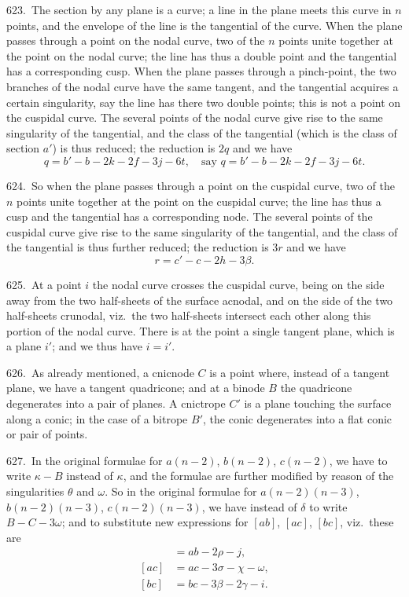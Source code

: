 \documentclass[11pt,a4paper]{article}
\theoremstyle{plain}
\theoremstyle{definition}
\theoremstyle{remark}
\begin{document}
623.\ The section by any plane is a curve; a line in the plane meets this curve in $n$ points, and the envelope of the line is the tangential of the curve. When the plane passes through a point on the nodal curve, two of the $n$ points unite together at the point on the nodal curve; the line has thus a double point and the tangential has a corresponding cusp. When the plane passes through a pinch-point, the two branches of the nodal curve have the same tangent, and the tangential acquires a certain singularity, say the line has there two double points; this is not a point on the cuspidal curve. The several points of the nodal curve give rise to the same singularity of the tangential, and the class of the tangential (which is the class of section $a'$) is thus reduced; the reduction is $2q$ and we have
\[
q = b'-b-2k-2f-3j-6t,\quad\text{say }q=b'-b-2k-2f-3j-6t.
\]

624.\ So when the plane passes through a point on the cuspidal curve, two of the $n$ points unite together at the point on the cuspidal curve; the line has thus a cusp and the tangential has a corresponding node. The several points of the cuspidal curve give rise to the same singularity of the tangential, and the class of the tangential is thus further reduced; the reduction is $3r$ and we have
\[
r=c'-c-2h-3\beta.
\]

625.\ At a point $i$ the nodal curve crosses the cuspidal curve, being on the side away from the two half-sheets of the surface acnodal, and on the side of the two half-sheets crunodal, viz.\ the two half-sheets intersect each other along this portion of the nodal curve. There is at the point a single tangent plane, which is a plane $i'$; and we thus have $i=i'$.

626.\ As already mentioned, a cnicnode $C$ is a point where, instead of a tangent plane, we have a tangent quadricone; and at a binode $B$ the quadricone degenerates into a pair of planes. A cnictrope $C'$ is a plane touching the surface along a conic; in the case of a bitrope $B'$, the conic degenerates into a flat conic or pair of points.

\newpage
\setcounter{page}{614}

627.\ In the original formulae for $a(n-2)$, $b(n-2)$, $c(n-2)$, we have to write $\kappa-B$ instead of $\kappa$, and the formulae are further modified by reason of the singularities $\theta$ and $\omega$. So in the original formulae for $a(n-2)(n-3)$, $b(n-2)(n-3)$, $c(n-2)(n-3)$, we have instead of $\delta$ to write $B-C-3\omega$; and to substitute new expressions for $[ab]$, $[ac]$, $[bc]$, viz.\ these are
\begin{align*}
[ab] &= ab-2\rho-j,\\
[ac] &= ac-3\sigma-\chi-\omega,\\
[bc] &= bc-3\beta-2\gamma-i.
\end{align*}
\end{document}
